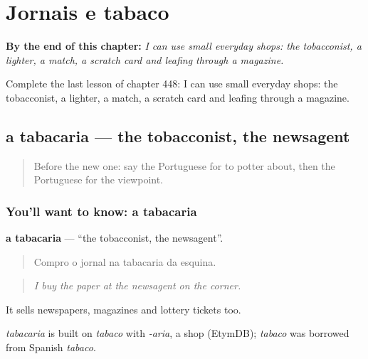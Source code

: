 
\chapter{Jornais e tabaco}
\label{ch:pt-jornais-e-tabaco}

\begin{chapteropening}
\textbf{By the end of this chapter:} \emph{I can use small everyday shops: the tobacconist, a lighter, a match, a scratch card and leafing through a magazine.}

Complete the last lesson of chapter 448: I can use small everyday shops: the tobacconist, a lighter, a match, a scratch card and leafing through a magazine.
\end{chapteropening}

\section[a tabacaria]{a tabacaria — the tobacconist, the newsagent}

\label{lesson:PT-C448-tabacaria}



\begin{quote}
Before the new one: say the Portuguese for to potter about, then the Portuguese for the viewpoint.
\end{quote}

\subsection*{You'll want to know: a tabacaria}
\textbf{a tabacaria} — \textquotedblleft{}the tobacconist, the newsagent\textquotedblright{}.

\begin{quote}
Compro o jornal na tabacaria da esquina.
\end{quote}

\begin{quote}
\emph{I buy the paper at the newsagent on the corner.}
\end{quote}

It sells newspapers, magazines and lottery tickets too.

\begin{cousinweb}
\emph{tabacaria} is built on \emph{tabaco} with \emph{-aria}, a shop (EtymDB); \emph{tabaco} was borrowed from Spanish \emph{tabaco}.
\end{cousinweb}

